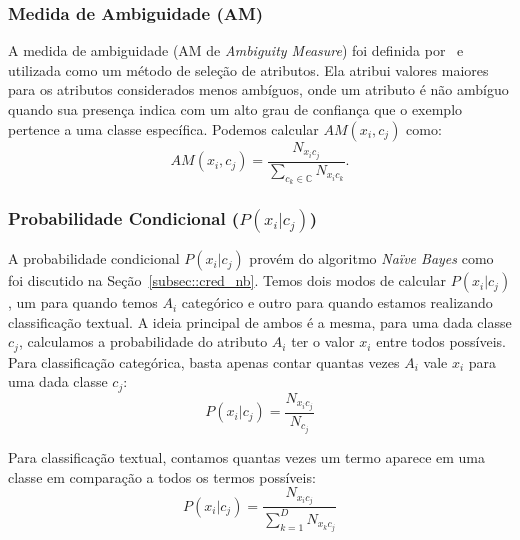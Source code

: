 \subsubsection{Medida de Ambiguidade (AM)}
\label{subsubsection::am}

A medida de ambiguidade (AM de \textit{Ambiguity Measure}) foi definida por~\cite{Mengle08} e utilizada como um método de seleção de atributos. Ela atribui valores maiores para os atributos considerados menos ambíguos, onde um atributo é não ambíguo quando sua presença indica com um alto grau de confiança que o exemplo pertence a uma classe específica. Podemos calcular $AM(x_i, c_j)$ como:
\begin{equation}\label{eqn::am}
   AM(x_i, c_j) = \frac{ N_{x_{i}c_{j}}}{\sum\limits_{c_k \in \mathbb{C}} N_{x_{i}c_{k}}}.
\end{equation}

\subsubsection{Probabilidade Condicional ($P(x_i|c_j)$)}
\label{subsubsection::pc}

A probabilidade condicional $P(x_i|c_j)$ provém do algoritmo \textit{Naïve Bayes} como foi discutido na Seção~\ref{subsec::cred_nb}.
Temos dois modos de calcular $P(x_i|c_j)$, um para quando temos $A_i$ categórico e outro para quando estamos realizando classificação textual.
A ideia principal de ambos é a mesma, para uma dada classe $c_j$, calculamos a probabilidade do atributo $A_i$ ter o valor $x_i$ entre todos possíveis. 
Para classificação categórica, basta apenas contar quantas vezes $A_i$ vale $x_i$ para uma dada classe $c_j$:
    \begin{equation}\label{eqn::nbcattexto}
        P(x_i|c_j) = \frac{ N_{x_{i}c_{j}} }{ N_{c_{j}} } 
    \end{equation}
        
Para classificação textual, contamos quantas vezes um termo aparece em uma classe em comparação a todos os termos possíveis:
    \begin{equation}\label{eqn::nbcattexto}
        P(x_i|c_j) = \frac{ N_{x_{i}c_{j}} }{ \sum\limits^{D}_{k = 1} {  N_{x_{k}c_{j}}} } 
    \end{equation}

